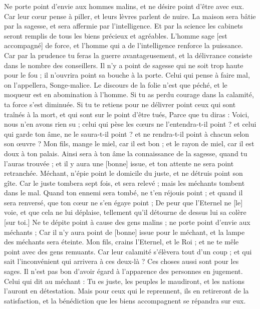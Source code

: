 \begin{multicols}{2}
\VerseOne{}Ne porte point d'envie aux hommes malins, et ne désire point d'être avec eux.
Car leur cœur pense à piller, et leurs lèvres parlent de nuire.
La maison sera bâtie par la sagesse, et sera affermie par l'intelligence.
Et par la science les cabinets seront remplis de tous les biens précieux et agréables.
L'homme sage [est accompagné] de force, et l'homme qui a de l'intelligence renforce la puissance.
Car par la prudence tu feras la guerre avantageusement, et la délivrance consiste dans le nombre des conseillers.
Il n'y a point de sagesse qui ne soit trop haute pour le fou ; il n'ouvrira point sa bouche à la porte.
Celui qui pense à faire mal, on l'appellera, Songe-malice.
Le discours de la folie n'est que péché, et le moqueur est en abomination à l'homme.
Si tu as perdu courage dans la calamité, ta force s'est diminuée.
Si tu te retiens pour ne délivrer point ceux qui sont traînés à la mort, et qui sont sur le point d'être tués,
Parce que tu diras : Voici, nous n'en avons rien su ; celui qui pèse les cœurs ne l'entendra-t-il point ? et celui qui garde ton âme, ne le saura-t-il point ? et ne rendra-t-il point à chacun selon son œuvre ?
Mon fils, mange le miel, car il est bon ; et le rayon de miel, car il est doux à ton palais.
Ainsi sera à ton âme la connaissance de la sagesse, quand tu l'auras trouvée ; et il y aura une [bonne] issue, et ton attente ne sera point retranchée.
Méchant, n'épie point le domicile du juste, et ne détruis point son gîte.
Car le juste tombera sept fois, et sera relevé ; mais les méchants tombent dans le mal.
Quand ton ennemi sera tombé, ne t'en réjouis point ; et quand il sera renversé, que ton cœur ne s'en égaye point ;
De peur que l'Eternel ne [le] voie, et que cela ne lui déplaise, tellement qu'il détourne de dessus lui sa colère [sur toi.]
Ne te dépite point à cause des gens malins ; ne porte point d'envie aux méchants ;
Car il n'y aura point de [bonne] issue pour le méchant, et la lampe des méchants sera éteinte.
Mon fils, crains l'Eternel, et le Roi ; et ne te mêle point avec des gens remuants.
Car leur calamité s'élèvera tout d'un coup ; et qui sait l'inconvénient qui arrivera à ces deux-là ?
Ces choses aussi sont pour les sages. Il n'est pas bon d'avoir égard à l'apparence des personnes en jugement.
Celui qui dit au méchant : Tu es juste, les peuples le maudiront, et les nations l'auront en détestation.
Mais pour ceux qui le reprennent, ils en retireront de la satisfaction, et la bénédiction que les biens accompagnent se répandra sur eux.

\end{multicols}
